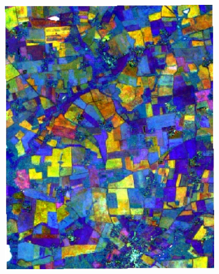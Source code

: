 \documentclass[journal,article,submit,pdftex,moreauthors]{Definitions/mdpi}
\providecommand{\DIFaddbeginFL}{} %
\providecommand{\DIFaddendFL}{} %
\providecommand{\DIFdelbeginFL}{} %
\providecommand{\DIFdelendFL}{} %
\begin{document}
\begin{figure}[H]
\begin{subfigure}[t]{0.23\linewidth}
\DIFdelendFL \DIFaddbeginFL \includegraphics[width=0.95\linewidth]{figures/aes_1_layer_mse_results/composites/composite_image_1.pdf}
	\DIFaddendFL \caption{}
	\label{fig:color_map_b}
	\end{subfigure}
	\begin{subfigure}[t]{0.23\linewidth}
		\centering
	  \DIFdelbeginFL %

\end{subfigure}
\end{figure}
\end{document}
